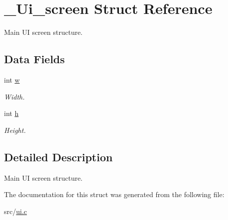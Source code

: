 \hypertarget{struct__Ui__screen}{}\section{\+\_\+\+Ui\+\_\+screen Struct Reference}
\label{struct__Ui__screen}


Main UI screen structure.  


\subsection*{Data Fields}
\begin{DoxyCompactItemize}
\item 
\mbox{\label{struct__Ui__screen_a0d1d60ef32f78df18ce4f7ac8b97e5ea}} 
int \hyperlink{struct__Ui__screen_a0d1d60ef32f78df18ce4f7ac8b97e5ea}{w}
\begin{DoxyCompactList}\small\item\em Width. \end{DoxyCompactList}\item 
\mbox{\label{struct__Ui__screen_ad16a11cf58cfd3423e7b5e9b2fa184e3}} 
int \hyperlink{struct__Ui__screen_ad16a11cf58cfd3423e7b5e9b2fa184e3}{h}
\begin{DoxyCompactList}\small\item\em Height. \end{DoxyCompactList}\end{DoxyCompactItemize}


\subsection{Detailed Description}
Main UI screen structure. 

The documentation for this struct was generated from the following file\+:\begin{DoxyCompactItemize}
\item 
src/\hyperlink{ui_8c}{ui.\+c}\end{DoxyCompactItemize}
